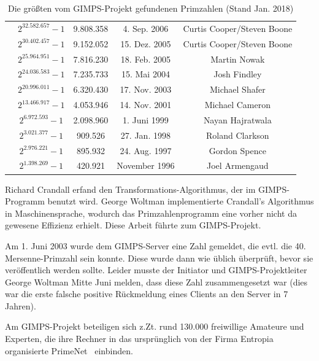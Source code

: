 \begin{refsegment}
\begin{table}[ht]
\begin{center}
\begin{tabular}{|c|cccc|}
	\rowno & $2^{32.582.657}-1$ &  9.808.358 & 4. Sep. 2006 & Curtis Cooper/Steven Boone \\
	\rowno & $2^{30.402.457}-1$ &  9.152.052 & 15. Dez. 2005 & Curtis Cooper/Steven Boone \\
	\rowno & $2^{25.964.951}-1$ &  7.816.230 & 18. Feb. 2005 & Martin Nowak \\
	\rowno & $2^{24.036.583}-1$ &  7.235.733 & 15. Mai 2004  & Josh Findley     \\
	\rowno & $2^{20.996.011}-1$ &  6.320.430 & 17. Nov. 2003 & Michael Shafer   \\
	\rowno & $2^{13.466.917}-1$ &  4.053.946 & 14. Nov. 2001 & Michael Cameron  \\
	\rowno & $2^{ 6.972.593}-1$ &  2.098.960 & 1. Juni 1999 & Nayan Hajratwala \\
	\rowno & $2^{ 3.021.377}-1$ &    909.526 & 27. Jan. 1998 & Roland Clarkson  \\
	\rowno & $2^{ 2.976.221}-1$ &    895.932 & 24. Aug. 1997 & Gordon Spence    \\
	\rowno & $2^{ 1.398.269}-1$ &    420.921 & November 1996 & Joel Armengaud   \\
\hline
\end{tabular}
\caption{Die größten vom GIMPS-Projekt gefundenen Primzahlen (Stand Jan. 2018)}
\label{Primes_GIMPS-Primes_table-reference}
\end{center}
\end{table}



Richard Crandall erfand den Transformations-Algorithmus,
der im GIMPS-Programm benutzt wird. George Woltman implementierte
Crandall's Algorithmus in Maschinensprache, wodurch das Primzahlenprogramm
eine vorher nicht da gewesene Effizienz erhielt.
Diese Arbeit führte zum GIMPS-Projekt.

Am 1. Juni 2003 wurde dem GIMPS-Server eine Zahl gemeldet, die evtl. die 40.
Mersenne-Primzahl sein konnte. Diese wurde dann wie üblich überprüft,
bevor sie veröffentlich werden sollte.
Leider musste der Initiator und GIMPS-Projektleiter George Woltman Mitte Juni
melden, dass diese Zahl zusammengesetzt war (dies war die erste falsche
positive Rückmeldung eines Clients an den Server in 7 Jahren).

Am GIMPS-Projekt beteiligen sich z.Zt. rund 130.000
freiwillige Amateure und Experten, die ihre Rechner in das ursprünglich von der
Firma Entropia organisierte \glqq PrimeNet\grqq~ einbinden.







\end{refsegment}
